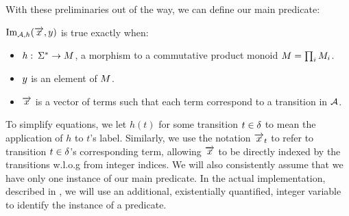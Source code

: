 \documentclass[runningheads]{llncs}
\begin{document}
  With these preliminaries out of the way, we can define our main predicate:

\begin{definition}
$\operatorname{Im}_{\mathcal{A}, h}(\overrightarrow{x}, y)$ is true exactly when:
\begin{itemize}
\item $h:\: \Sigma^* \rightarrow M$, a morphism to a commutative product monoid $M = \prod_{i} M_i$.
\item $y$ is an element of $M$.
\item $\overrightarrow{x}$ is a vector of terms such that each term correspond to a
  transition in $\mathcal{A}$.
\end{itemize}
\end{definition}

To simplify equations, we let $h(t)$ for some transition $t \in \delta$ to
mean the application of $h$ to $t$'s label. Similarly, we use the notation
$\overrightarrow{x}_t$ to refer to transition $t \in \delta$'s corresponding
term, allowing $\overrightarrow{x}$ to be directly indexed by the transitions
w.l.o.g from integer indices. We will also consistently assume that we have only one instance of our main predicate. In the actual implementation, described in , we will use an additional, existentially quantified, integer variable to identify the instance of a predicate.
  
\end{document}
